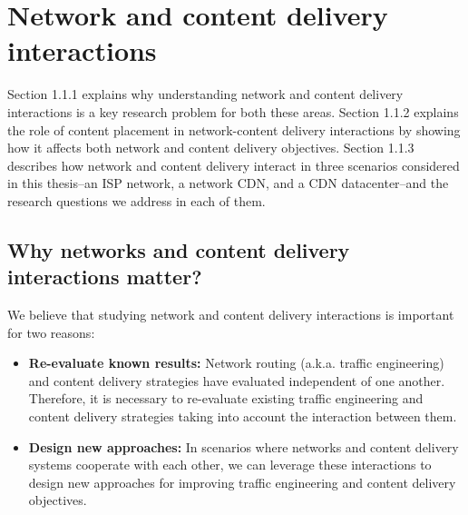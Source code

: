 

\section{Network and content delivery interactions}

Section 1.1.1 explains why understanding network and content delivery interactions is a key research problem for both these areas. 
Section 1.1.2 explains the role of content placement in network-content delivery interactions by showing how it affects both network and content delivery objectives. 
Section 1.1.3 describes how network and content delivery interact in three scenarios considered in this thesis--an ISP network, a network CDN, and a CDN datacenter--and the research questions we address in each of them.


 

\subsection{Why networks and content delivery interactions matter?}
We believe that studying network and content delivery interactions is important for two reasons: 
\begin{itemize}
\item
\textbf{Re-evaluate known results:} Network routing (a.k.a. traffic engineering)  and content delivery  strategies have evaluated independent of one another. Therefore, it is necessary to re-evaluate existing traffic engineering and content delivery strategies taking into account the interaction between them.
\item
\textbf{Design new approaches:} In scenarios where networks and content delivery systems cooperate with each other, we can leverage these interactions to design new approaches for improving traffic engineering and content delivery objectives.
\end{itemize}

